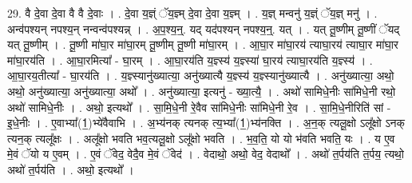\documentclass[17pt]{extarticle}
\begin{document}
29. वै दे॒वा दे॒वा वै वै दे॒वाः । . दे॒वा य॒ज्ञ्ं ॅय॒ज्ञ्म् दे॒वा दे॒वा य॒ज्ञ्म् । . य॒ज्ञ् मन्वनु॑ य॒ज्ञ्ं ॅय॒ज्ञ् मनु॑ । . अन्व॑पश्यन् नपश्य॒न् नन्वन्व॑पश्यन्न् । . अ॒प॒श्य॒न्॒. यद् यद॑पश्यन् नपश्य॒न्॒. यत् । . यत् तू॒ष्णीम् तू॒ष्णीं ॅयद् यत् तू॒ष्णीम् । . तू॒ष्णी मा॑घा॒र मा॑घा॒रम् तू॒ष्णीम् तू॒ष्णी मा॑घा॒रम् । . आ॒घा॒र मा॑घा॒रय॑ त्याघा॒रय॑ त्याघा॒र मा॑घा॒र मा॑घा॒रय॑ति । . आ॒घा॒रमित्या᳚ - घा॒रम् । . आ॒घा॒रय॑ति य॒ज्ञ्स्य॑ य॒ज्ञ्स्या॑ घा॒रय॑ त्याघा॒रय॑ति य॒ज्ञ्स्य॑ । . आ॒घा॒रय॒तीत्या᳚ - घा॒रय॑ति । . य॒ज्ञ्स्यानु॑ख्यात्या॒ अनु॑ख्यात्यै य॒ज्ञ्स्य॑ य॒ज्ञ्स्यानु॑ख्यात्यै । . अनु॑ख्यात्या॒ अथो॒ अथो॒ अनु॑ख्यात्या॒ अनु॑ख्यात्या॒ अथो᳚ । . अनु॑ख्यात्या॒ इत्यनु॑ - ख्या॒त्यै॒ । . अथो॑ सामिधे॒नीः सा॑मिधे॒नी रथो॒ अथो॑ सामिधे॒नीः । . अथो॒ इत्यथो᳚ । . सा॒मि॒धे॒नी रे॒वैव सा॑मिधे॒नीः सा॑मिधे॒नी रे॒व । . सा॒मि॒धे॒नीरिति॑ सां - इ॒धे॒नीः । . ए॒वाभ्या᳚(1॒)भ्ये॑वैवाभि । . अ॒भ्य॑नक् त्यनक् त्य॒भ्या᳚(1॒)भ्य॑नक्ति । . अ॒न॒क् त्यलू॒क्षो ऽलू᳚क्षो ऽनक् त्यन॒क् त्यलू᳚क्षः । . अलू᳚क्षो भवति भव॒त्यलू॒क्षो ऽलू᳚क्षो भवति । . भ॒व॒ति॒ यो यो भ॑वति भवति॒ यः । . य ए॒व मे॒वं ॅयो य ए॒वम् । . ए॒वं ॅवेद॒ वेदै॒व मे॒वं ॅवेद॑ । . वेदाथो॒ अथो॒ वेद॒ वेदाथो᳚ । . अथो॑ त॒र्पय॑ति त॒र्पय॒ त्यथो॒ अथो॑ त॒र्पय॑ति । . अथो॒ इत्यथो᳚ । \newline
\end{document}
